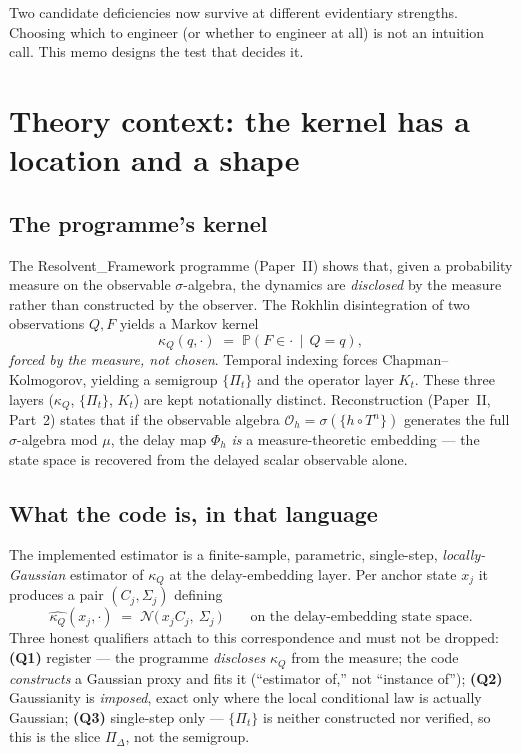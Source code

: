 \documentclass[11pt]{article}
\newcommand{\kQ}{\kappa_{Q}}
\newcommand{\Nrm}{\mathcal{N}}
\begin{document}
Two candidate deficiencies now survive at different evidentiary
strengths. Choosing which to engineer (or whether to engineer at all) is
not an intuition call. This memo designs the test that decides it.

\section{Theory context: the kernel has a location and a shape}
\label{sec:theory}

\subsection{The programme's kernel}

The Resolvent\_Framework programme (Paper~II) shows that, given a
probability measure on the observable $\sigma$-algebra, the dynamics are
\emph{disclosed} by the measure rather than constructed by the observer.
The Rokhlin disintegration of two observations $Q,F$ yields a Markov
kernel
\[
  \kQ(q,\cdot) \;=\; \mathbb{P}\!\left(F \in \cdot \,\middle|\, Q = q\right),
\]
\emph{forced by the measure, not chosen}. Temporal indexing forces
Chapman--Kolmogorov, yielding a semigroup $\{\Pi_t\}$ and the operator
layer $K_t$. These three layers ($\kQ$, $\{\Pi_t\}$, $K_t$) are kept
notationally distinct. Reconstruction (Paper~II, Part~2) states that if
the observable algebra $\mathcal{O}_h = \sigma(\{h\circ T^n\})$ generates
the full $\sigma$-algebra mod $\mu$, the delay map $\Phi_h$ \emph{is} a
measure-theoretic embedding --- the state space is recovered from the
delayed scalar observable alone.

\subsection{What the code is, in that language}

The implemented estimator is a finite-sample, parametric, single-step,
\emph{locally-Gaussian} estimator of $\kQ$ at the delay-embedding layer.
Per anchor state $x_j$ it produces a pair $(C_j,\Sigma_j)$ defining
\begin{equation}
\label{eq:kernel}
  \widehat{\kQ}(x_j,\cdot) \;=\; \Nrm\!\big(\,x_j C_j,\ \Sigma_j\,\big)
  \qquad\text{on the delay-embedding state space.}
\end{equation}
Three honest qualifiers attach to this correspondence and must not be
dropped: \textbf{(Q1)} register --- the programme \emph{discloses} $\kQ$
from the measure; the code \emph{constructs} a Gaussian proxy and fits it
(``estimator of,'' not ``instance of''); \textbf{(Q2)} Gaussianity is
\emph{imposed}, exact only where the local conditional law is actually
Gaussian; \textbf{(Q3)} single-step only --- $\{\Pi_t\}$ is neither
constructed nor verified, so this is the slice $\Pi_\Delta$, not the
semigroup.
\end{document}
